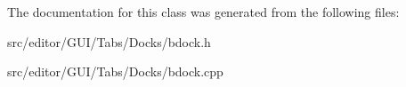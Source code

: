 \-The documentation for this class was generated from the following files\-:\begin{DoxyCompactItemize}
\item 
src/editor/\-G\-U\-I/\-Tabs/\-Docks/bdock.\-h\item 
src/editor/\-G\-U\-I/\-Tabs/\-Docks/bdock.\-cpp\end{DoxyCompactItemize}
